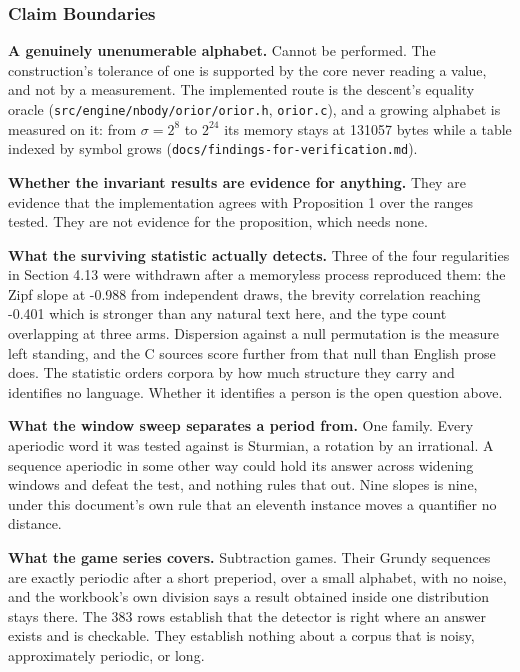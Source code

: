 \subsubsection{Claim Boundaries}

\textbf{A genuinely unenumerable alphabet.} Cannot be performed. The construction's tolerance of one is supported by the core never reading a value, and not by a measurement. The implemented route is the descent's equality oracle (\texttt{src/\allowbreak{}engine/\allowbreak{}nbody/\allowbreak{}orior/\allowbreak{}orior.h}, \texttt{orior.c}), and a growing alphabet is measured on it: from \(\sigma = 2^8\) to \(2^{24}\) its memory stays at 131057 bytes while a table indexed by symbol grows (\texttt{docs/\allowbreak{}findings-\allowbreak{}for-\allowbreak{}verification.md}).

\textbf{Whether the invariant results are evidence for anything.} They are evidence that the implementation agrees with Proposition 1 over the ranges tested. They are not evidence for the proposition, which needs none.

\textbf{What the surviving statistic actually detects.} Three of the four regularities in Section 4.13 were withdrawn after a memoryless process reproduced them: the Zipf slope at -0.988 from independent draws, the brevity correlation reaching -0.401 which is stronger than any natural text here, and the type count overlapping at three arms. Dispersion against a null permutation is the measure left standing, and the C sources score further from that null than English prose does. The statistic orders corpora by how much structure they carry and identifies no language. Whether it identifies a person is the open question above.

\textbf{What the window sweep separates a period from.} One family. Every aperiodic word it was tested against is Sturmian, a rotation by an irrational. A sequence aperiodic in some other way could hold its answer across widening windows and defeat the test, and nothing rules that out. Nine slopes is nine, under this document's own rule that an eleventh instance moves a quantifier no distance.

\textbf{What the game series covers.} Subtraction games. Their Grundy sequences are exactly periodic after a short preperiod, over a small alphabet, with no noise, and the workbook's own division says a result obtained inside one distribution stays there. The 383 rows establish that the detector is right where an answer exists and is checkable. They establish nothing about a corpus that is noisy, approximately periodic, or long.

